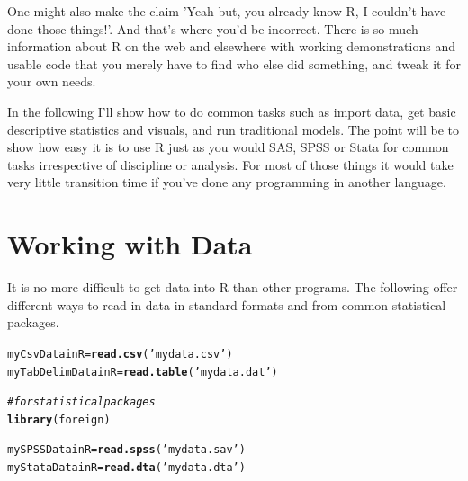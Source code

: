\documentclass[english,nohyper,titlepage]{tufte-handout}\usepackage[]{graphicx}\usepackage[]{color}
\makeatletter
\newcommand{\hlstr}[1]{\textcolor[rgb]{0.192,0.494,0.8}{#1}}%
\newcommand{\hlcom}[1]{\textcolor[rgb]{0.678,0.584,0.686}{\textit{#1}}}%
\newcommand{\hlstd}[1]{\textcolor[rgb]{0.345,0.345,0.345}{#1}}%
\newcommand{\hlkwb}[1]{\textcolor[rgb]{0.69,0.353,0.396}{#1}}%
\newcommand{\hlkwd}[1]{\textcolor[rgb]{0.737,0.353,0.396}{\textbf{#1}}}%
\newenvironment{kframe}{%
 \def\at@end@of@kframe{}%
 \ifinner\ifhmode%
  \def\at@end@of@kframe{\end{minipage}}%
  \begin{minipage}{\columnwidth}%
 \fi\fi%
 \def\FrameCommand##1{\hskip\@totalleftmargin \hskip-\fboxsep
 \colorbox{shadecolor}{##1}\hskip-\fboxsep
     \hskip-\linewidth \hskip-\@totalleftmargin \hskip\columnwidth}%
 \MakeFramed {\advance\hsize-\width
   \@totalleftmargin\z@ \linewidth\hsize
   \@setminipage}}%
 {\par\unskip\endMakeFramed%
 \at@end@of@kframe}
\newenvironment{knitrout}{}{} %
\makeatother
\begin{document}
One might also make the claim 'Yeah but, you already know R, I couldn't have done those things!'.  And that's where you'd be incorrect.  There is so much information about R on the web and elsewhere with working demonstrations and usable code that you merely have to find who else did something, and tweak it for your own needs.  

In the following I'll show how to do common tasks such as import data, get basic descriptive statistics and visuals, and run traditional models.  The point will be to show how easy it is to use R just as you would SAS, SPSS or Stata for common tasks irrespective of discipline or analysis.  For most of those things it would take very little transition time if you've done any programming in another language.






\part{Working with Data}

It is no more difficult to get data into R than other programs.  The following offer different ways to read in data in standard formats and from common statistical packages.

\begin{knitrout}\footnotesize
{}\color{fgcolor}\begin{kframe}
\begin{alltt}
\hlstd{myCsvDatainR} \hlkwb{=} \hlkwd{read.csv}\hlstd{(}\hlstr{'mydata.csv'}\hlstd{)}
\hlstd{myTabDelimDatainR} \hlkwb{=} \hlkwd{read.table}\hlstd{(}\hlstr{'mydata.dat'}\hlstd{)}

\hlcom{# for statistical packages}
\hlkwd{library}\hlstd{(foreign)}

\hlstd{mySPSSDatainR} \hlkwb{=} \hlkwd{read.spss}\hlstd{(}\hlstr{'mydata.sav'}\hlstd{)}
\hlstd{myStataDatainR} \hlkwb{=} \hlkwd{read.dta}\hlstd{(}\hlstr{'mydata.dta'}\hlstd{)}
\end{alltt}
\end{kframe}
\end{knitrout}
\end{document}
